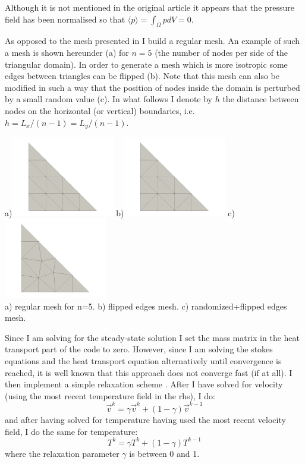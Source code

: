 Although it is not mentioned in the original article it appears that the 
pressure field has been normalised so that $\langle p \rangle = \int_\Omega p dV=0$.

As opposed to the mesh presented in \cite{jolm17} I build a regular mesh.
An example of such a mesh is shown hereunder (a) for $n=5$ (the number of nodes
per side of the triangular domain). 
In order to generate a mesh which is more isotropic some edges between 
triangles can be flipped (b). 
Note that this mesh can also be modified in such a way that the position of 
nodes inside the domain is perturbed by a small random value (c).
In what follows I denote by $h$ the distance between nodes
on the horizontal (or vertical) boundaries, i.e. $h=L_x/(n-1)=L_y/(n-1)$.
\begin{center}
a)\includegraphics[width=4.5cm]{python_codes/fieldstone_51/images/minigrid5a}
b)\includegraphics[width=4.5cm]{python_codes/fieldstone_51/images/minigrid5b}
c)\includegraphics[width=4.5cm]{python_codes/fieldstone_51/images/minigrid5c}\\
{\small a) regular mesh for n=5. b) flipped edges mesh. c) randomized+flipped edges mesh.}
\end{center}

Since I am solving for the steady-state solution I set the mass matrix in the 
heat transport part of the code to zero. However, since I am solving the stokes equations
and the heat transport equation alternatively until convergence is reached, it is well 
known that this approach does not converge fast (if at all). 
I then implement a simple relaxation scheme \cite{vyrc13}. After I have solved for velocity (using the 
most recent temperature field in the rhs), I do:
\[
\vec{v}^k = \gamma \vec{v}^k + (1-\gamma) \vec{v}^{k-1}
\]
and after having solved for temperature having used the most recent velocity field, 
I do the same for temperature:
\[
{T}^k = \gamma {T}^k + (1-\gamma) {T}^{k-1}
\]
where the relaxation parameter $\gamma$ is between 0 and 1.




